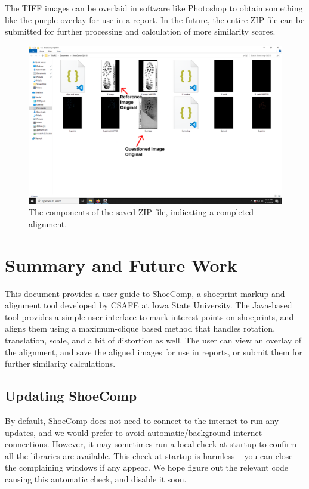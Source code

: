 \documentclass{csafedoc}
\begin{document}
The TIFF images can be overlaid in software like Photoshop to obtain something like the
purple overlay for use in a report. In the future, the entire ZIP file can be submitted
for further processing and calculation of more similarity scores.

\begin{figure}[H]
	\begin{center}
		\includegraphics[width=0.8\linewidth]{images/step_10-anno.png}
	\end{center}
	\caption{The components of the saved ZIP file, indicating a completed alignment.}
	\label{fig:step10}
\end{figure}

\newpage
\chapter{Summary and Future Work}%

This document provides a user guide to ShoeComp, a shoeprint markup and alignment tool
developed by CSAFE at Iowa State University. The Java-based tool provides a simple user
interface to mark interest points on shoeprints, and aligns them using a maximum-clique
based method that handles rotation, translation, scale, and a bit of distortion as well.
The user can view an overlay of the alignment, and save the aligned images for use in
reports, or submit them for further similarity calculations.

\section{Updating ShoeComp}

By default, ShoeComp does not need to connect to the internet to run any updates, and we
would prefer to avoid automatic/background internet connections. However, it may sometimes
run a local check at startup to confirm all the libraries are available. This check at
startup is harmless -- you can close the complaining windows if any appear. We hope figure
out the relevant code causing this automatic check, and disable it soon. \\
\end{document}
